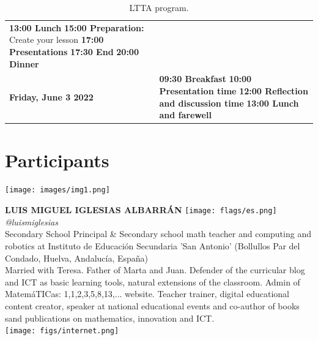 \documentclass[11pt]{article}
\begin{document}
\begin{table}
\begin{center}
\begin{tabular}{m{6cm} m{8cm}}
        \newline \textbf{13:00 Lunch} \newline
        \textbf{15:00 Preparation:} Create your lesson
        \newline
        \textbf{17:00 Presentations} \newline
        \textbf{17:30 End} \newline
        \textbf{20:00 Dinner} \\
        \rowcolor{gray!15}
        \centering\textbf{Friday, June 3 2022} &
        \textbf{09:30 Breakfast} \newline 
        \textbf{10:00 Presentation time} \newline 
        \textbf{12:00 Reflection and discussion time} \newline 
        \textbf{13:00 Lunch and farewell} \\
        \bottomrule%
    \end{tabular}
      \caption[LTTA program]{LTTA program.}
      \label{tab:program}
     \end{center}
    \end{table}

    \newpage

\section*{Participants}
\noindent
\begin{minipage}{0.3\textwidth}
\centering
\texttt{[image: images/img1.png]}
\end{minipage}
\hfill
\begin{minipage}{0.6\textwidth}\raggedright
\color{color1}\uppercase{\textbf{Luis Miguel Iglesias Albarrán}}
\color{color2}\hspace{0.2cm}\texttt{[image: flags/es.png]}
\hspace{0.2cm}\textit{@luismiglesias}
\\
Secondary School Principal \& Secondary school math teacher and computing and robotics at Instituto de Educación Secundaria 'San Antonio' (Bollullos Par del Condado, Huelva, Andalucía, España)\\
{\footnotesize Married with Teresa. Father of Marta and Juan. Defender of the curricular blog and ICT as basic learning tools, natural extensions of the classroom. Admin of MatemáTICas: 1,1,2,3,5,8,13,... website. Teacher trainer, digital educational content creator, speaker at national educational events and co-author of books sand publications on mathematics, innovation and ICT.}\\
\texttt{[image: figs/internet.png]}
\end{minipage}
\newline\newline\newline
\end{document}
